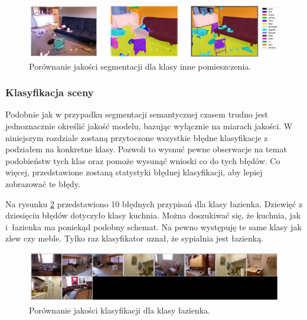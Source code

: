 \begin{figure}[ht!]
    \centering
    \includegraphics[width=\textwidth]{img/preds_analysis/gt_vs_pred/other_indoor-3.png}
    \caption{Porównanie jakości segmentacji dla klasy inne pomieszczenia.}
    \label{fig:other_indoor-pred-3}
\end{figure}

\subsubsection{Klasyfikacja sceny}
Podobnie jak w przypadku segmentacji semantycznej czasem trudno jest jednoznacznie określić jakość modelu, bazując wyłącznie na miarach jakości. W niniejszym rozdziale zostaną przytoczone wszystkie błędne klasyfikacje z podziałem na konkretne klasy. Pozwoli to wysnuć pewne obserwacje na temat podobieństw tych klas oraz pomoże wysunąć wnioski co do tych błędów. Co więcej, przedstawione zostaną statystyki błędnej klasyfikacji, aby lepiej zobrazować te błędy.

Na rysunku \ref{fig:bathroom-false-pred} przedstawiono 10 błędnych przypisań dla klasy łazienka. Dziewięć z dziesięciu błędów dotyczyło klasy kuchnia. Można doszukiwać się, że kuchnia, jak i~łazienka ma poniekąd podobny schemat. Na pewno występuję te same klasy jak zlew czy meble. Tylko raz klasyfikator uznał, że sypialnia jest łazienką.
\begin{figure}[ht!]
    \centering
    \includegraphics[width=\textwidth]{img/preds_analysis/classification/bathroom-2.png}
    \caption{Porównanie jakości klasyfikacji dla klasy łazienka.}
    \label{fig:bathroom-false-pred}
\end{figure}

